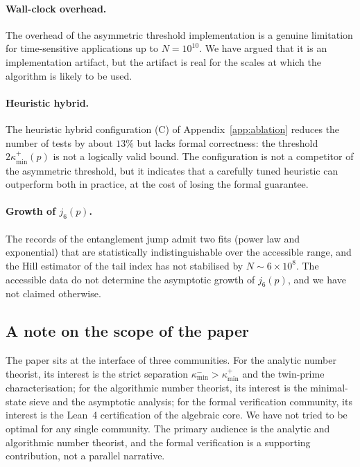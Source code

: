 \documentclass[11pt]{amsart}
\numberwithin{equation}{section}
\newcommand{\kminp}{\kappa_{\min}^{+}}
\newcommand{\kminm}{\kappa_{\min}^{-}}
\theoremstyle{plain}
\theoremstyle{definition}
\begin{document}
\paragraph{Wall-clock overhead.} The overhead of the asymmetric
threshold implementation is a genuine limitation for time-sensitive
applications up to $N=10^{10}$. We have argued that it is an
implementation artifact, but the artifact is real for the scales at
which the algorithm is likely to be used.

\paragraph{Heuristic hybrid.} The heuristic hybrid configuration (C)
of Appendix~\ref{app:ablation} reduces the number of tests by about
$13\%$ but lacks formal correctness: the threshold $2\kminp(p)$ is
not a logically valid bound. The configuration is not a competitor of
the asymmetric threshold, but it indicates that a carefully tuned
heuristic can outperform both in practice, at the cost of losing the
formal guarantee.

\paragraph{Growth of $j_6(p)$.} The records of the entanglement jump
admit two fits (power law and exponential) that are statistically
indistinguishable over the accessible range, and the Hill estimator
of the tail index has not stabilised by $N\sim 6\times 10^8$. The
accessible data do not determine the asymptotic growth of $j_6(p)$,
and we have not claimed otherwise.

\subsection*{A note on the scope of the paper}

The paper sits at the interface of three communities. For the
analytic number theorist, its interest is the strict separation
$\kminm>\kminp$ and the twin-prime characterisation; for the
algorithmic number theorist, its interest is the minimal-state sieve
and the asymptotic analysis; for the formal verification community,
its interest is the Lean~4 certification of the algebraic core. We
have not tried to be optimal for any single community. The primary
audience is the analytic and algorithmic number theorist, and the
formal verification is a supporting contribution, not a parallel
narrative.

\end{document}
